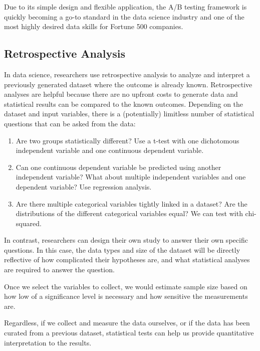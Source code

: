 \documentclass[11pt]{article}
\begin{document}
Due to its simple design and flexible application, the A/B testing framework is quickly becoming a go-to standard in the data science industry and one of the most highly desired data skills for Fortune 500 companies.

\subsection{Retrospective Analysis}
\label{sec:orgee0cef2}

In data science, researchers use retrospective analysis to analyze and interpret a previously generated dataset where the outcome is already known. Retrospective analyses are helpful because there are no upfront costs to generate data and statistical results can be compared to the known outcomes. Depending on the dataset and input variables, there is a (potentially) limitless number of statistical questions that can be asked from the data:

\begin{enumerate}
\item Are two groups statistically different? Use a t-test with one dichotomous independent variable and one continuous dependent variable.
\item Can one continuous dependent variable be predicted using another independent variable? What about multiple independent variables and one dependent variable? Use regression analysis.
\item Are there multiple categorical variables tightly linked in a dataset? Are the distributions of the different categorical variables equal? We can test with chi-squared.
\end{enumerate}

In contrast, researchers can design their own study to answer their own specific questions. In this case, the data types and size of the dataset will be directly reflective of how complicated their hypotheses are, and what statistical analyses are required to answer the question.

Once we select the variables to collect, we would estimate sample size based on how low of a significance level is necessary and how sensitive the measurements are.

Regardless, if we collect and measure the data ourselves, or if the data has been curated from a previous dataset, statistical tests can help us provide quantitative interpretation to the results.
\end{document}
